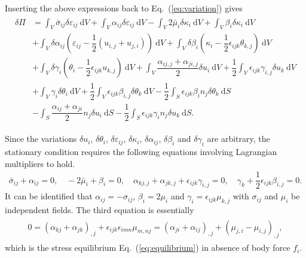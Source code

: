 \documentclass[3p,sort&compress,11pt,fleqn]{elsarticle}
\newcommand*{\eqsref}[1]{Eq.~(\ref{#1})}
\newcommand*{\md}[1]{\mathrm{d}#1}
\begin{document}
Inserting the above expressions back to \eqsref{eq:variation} gives
\begin{gather}
\begin{split}
\delta\varPi&=
\int_V\bar{\sigma}_{ij}\delta\varepsilon_{ij}~\md{V}+\int_V\alpha_{ij}\delta{}\varepsilon_{ij}~\md{V}
-\int_V2\bar{\mu}_{i}\delta\kappa_i~\md{V}+\int_V\beta_i\delta{}\kappa_i~\md{V}\\&
+\int_V\delta{}\alpha_{ij}\left(\varepsilon_{ij}-\dfrac{1}{2}\left(u_{i,j}+u_{j,i}\right)\right)~\md{V}
+\int_V\delta{}\beta_i\left(\kappa_i-\dfrac{1}{2}\epsilon_{ijk}\theta_{k,j}\right)~\md{V}\\&
+\int_V\delta{}\gamma_i\left(\theta_i-\dfrac{1}{2}\epsilon_{ijk}u_{k,j}\right)~\md{V}
+\int_V\dfrac{\alpha_{ij,j}+\alpha_{ji,j}}{2}\delta{}u_i~\md{V}
+\dfrac{1}{2}\int_V\epsilon_{ijk}\gamma_{i,j}\delta{}u_k~\md{V}\\&
+\int_V\gamma_i\delta{}\theta_i~\md{V}+\dfrac{1}{2}\int_V\epsilon_{ijk}\beta_{i,j}\delta\theta_k~\md{V}-\dfrac{1}{2}\int_S\epsilon_{ijk}\beta_in_j\delta\theta_k~\md{S}\\&
-\int_S\dfrac{\alpha_{ij}+\alpha_{ji}}{2}n_j\delta{}u_i~\md{S}-\dfrac{1}{2}\int_S\epsilon_{ijk}\gamma_in_j\delta{}u_k~\md{S}.
\end{split}
\end{gather}

Since the variations $\delta{}u_i$, $\delta{}\theta_i$, $\delta{}\varepsilon_{ij}$, $\delta{}\kappa_i$, $\delta{}\alpha_{ij}$, $\delta{}\beta_i$ and $\delta{}\gamma_i$ are arbitrary, the stationary condition requires the following equations involving Lagrangian multipliers to hold.
\begin{gather}
\bar{\sigma}_{ij}+\alpha_{ij}=0,\quad
-2\bar{\mu}_i+\beta_i=0,\quad
\alpha_{kj,j}+\alpha_{jk,j}+\epsilon_{ijk}\gamma_{i,j}=0,\quad
\gamma_k+\dfrac{1}{2}\epsilon_{ijk}\beta_{i,j}=0.
\end{gather}
It can be identified that $\alpha_{ij}=-\sigma_{ij}$, $\beta_i=2\mu_i$ and $\gamma_i=\epsilon_{ijk}\mu_{k,j}$ with $\sigma_{ij}$ and $\mu_i$ be independent fields. The third equation is essentially
\begin{gather*}
\begin{split}
0=\left(\alpha_{kj}+\alpha_{jk}\right)_{,j}+\epsilon_{ijk}\epsilon_{imn}\mu_{m,nj}=\left(\alpha_{ji}+\alpha_{ij}\right)_{,j}+\left(\mu_{j,i}-\mu_{i,j}\right)_{,j},
\end{split}
\end{gather*}
which is the stress equilibrium \eqsref{eq:equilibrium} in absence of body force $f_i$.
\end{document}
